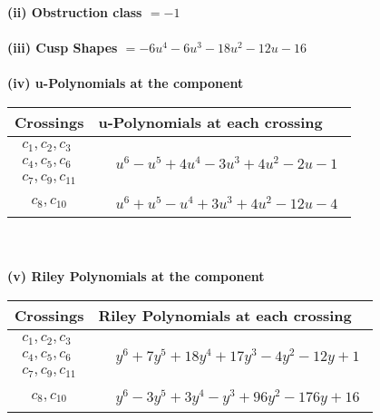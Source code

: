 \documentclass[1p]{elsarticle_modified}
\theoremstyle{definition}
\begin{document}
\flushleft \textbf{(ii) Obstruction class $= -1$}\\~\\
\flushleft \textbf{(iii) Cusp Shapes $= -6 u^4-6 u^3-18 u^2-12 u-16$}\\~\\
\newpage\renewcommand{\arraystretch}{1}
\flushleft \textbf{(iv) u-Polynomials at the component}\newline \\
\begin{tabular}{m{50pt}|m{274pt}}
Crossings & \hspace{64pt}u-Polynomials at each crossing \\
\hline $$\begin{aligned}c_{1},c_{2},c_{3}\\c_{4},c_{5},c_{6}\\c_{7},c_{9},c_{11}\end{aligned}$$&$\begin{aligned}
&u^6- u^5+4 u^4-3 u^3+4 u^2-2 u-1
\end{aligned}$\\
\hline $$\begin{aligned}c_{8},c_{10}\end{aligned}$$&$\begin{aligned}
&u^6+u^5- u^4+3 u^3+4 u^2-12 u-4
\end{aligned}$\\
\hline
\end{tabular}\\~\\
\newpage\renewcommand{\arraystretch}{1}
\flushleft \textbf{(v) Riley Polynomials at the component}\newline \\
\begin{tabular}{m{50pt}|m{274pt}}
Crossings & \hspace{64pt}Riley Polynomials at each crossing \\
\hline $$\begin{aligned}c_{1},c_{2},c_{3}\\c_{4},c_{5},c_{6}\\c_{7},c_{9},c_{11}\end{aligned}$$&$\begin{aligned}
&y^6+7 y^5+18 y^4+17 y^3-4 y^2-12 y+1
\end{aligned}$\\
\hline $$\begin{aligned}c_{8},c_{10}\end{aligned}$$&$\begin{aligned}
&y^6-3 y^5+3 y^4- y^3+96 y^2-176 y+16
\end{aligned}$\\
\hline
\end{tabular}\\~\\
\end{document}
